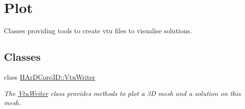 \hypertarget{group__Plot}{}\section{Plot}
\label{group__Plot}


Classes providing tools to create vtu files to visualise solutions.  


\subsection*{Classes}
\begin{DoxyCompactItemize}
\item 
class \hyperlink{classHArDCore3D_1_1VtuWriter}{H\+Ar\+D\+Core3\+D\+::\+Vtu\+Writer}
\begin{DoxyCompactList}\small\item\em The \hyperlink{classHArDCore3D_1_1VtuWriter}{Vtu\+Writer} class provides methods to plot a 3D mesh and a solution on this mesh. \end{DoxyCompactList}\end{DoxyCompactItemize}
